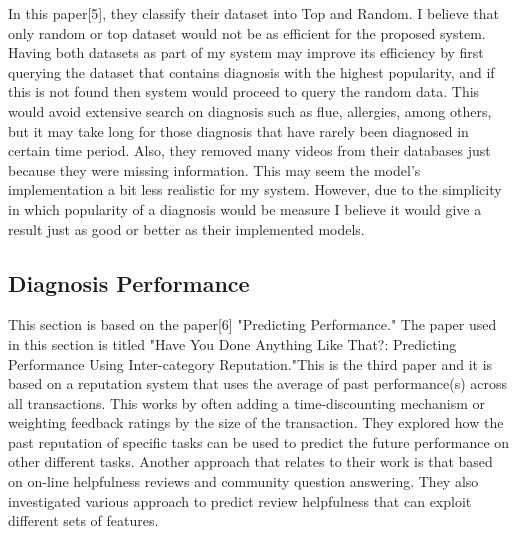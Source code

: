 \documentclass[sts]{sig-alternate}
\begin{document}
		In this paper[5], they classify their dataset into Top and Random. I believe that only random 			or top dataset would not be as efficient for the proposed system. Having both datasets as 				part of my system may improve its efficiency by first querying the dataset that contains 					diagnosis with the highest popularity, and if this is not found then system would proceed to 				query the random data. This would avoid extensive search on diagnosis such as flue, 						allergies, among others, but it may take long for those diagnosis that have rarely been 					diagnosed in certain time period. Also, they removed many videos from their databases just 				because they were missing information. This may seem the model's implementation a bit less 				realistic for my system. However, due to the simplicity in which popularity of a 	diagnosis 				would be measure I believe it would give a result just as good or better 	as their implemented 			models.

	\subsection{Diagnosis Performance}
		\label{Diagnosis Performance}
	
		This section is based on the paper[6] "Predicting Performance." The paper used in this section 			is titled "Have You Done Anything Like That?: Predicting Performance 	Using Inter-category 				Reputation."This is the third paper and it is based on a 	reputation system that uses the average 		of past performance(s) across all transactions. This works by often adding a time-discounting 			mechanism or weighting feedback ratings by the size of the transaction. They explored how the 			past reputation of specific  tasks can be used to predict the future performance on other 				different tasks. Another approach that relates to their work is that based on on-line 					helpfulness reviews and community question answering. They also investigated various approach to 		predict review helpfulness that can exploit different sets of features.
\end{document}
